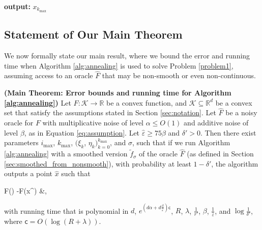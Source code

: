\documentclass[final,12pt]{colt2018} %
\def \be{\begin{equs}}
\def \ee{\end{equs}}
\begin{document}
{\begin{algorithm}[H]
%
%
\textbf{output:} $x_{k_\mathrm{max}}$
\end{algorithm}




\subsection{Statement of Our Main Theorem} \label{sec:theorem}
We now formally state our main result, where we bound the error and running time when Algorithm \ref{alg:annealing} is used to solve Problem \ref{problem1}, assuming access to an oracle $\hat{F}$ that may be non-smooth or even non-continuous.



\begin{theorem} \label{thm:main} \textbf{(Main Theorem: Error bounds and running time for Algorithm \ref{alg:annealing})}
%
Let $F: \mathcal{K} \rightarrow \mathbb{R}$ be a convex function, and $\mathcal{K} \subseteq \mathbb{R}^d$ be a convex set that satisfy the assumptions stated in Section \ref{sec:notation}.
%
  Let $\hat{F}$ be a noisy oracle for $F$ with multiplicative noise of level $\alpha \leq O(1)$ and additive noise of level $\beta$, as in Equation \eqref{eq:assumption}.  
%
Let $\hat{\varepsilon} \geq 75\beta$ and  $\delta' >0$.
%
%
Then there exist parameters  $i_{\textrm{max}}$, $k_{\textrm{max}}$, $(\xi_k$, $\eta_k)_{k=0}^{k_{\mathrm{max}}}$, and $\sigma$, such that if we run Algorithm \ref{alg:annealing} with a smoothed version $\tilde{f}_\sigma$ of the oracle $\hat{F}$  (as defined in Section \ref{sec:smoothed_from_nonsmooth}), with probability at least  $1-\delta'$, the algorithm outputs a point $\hat{x}$ such that
%
\be
F() -F(x^\star) &\leq \hat{\varepsilon},
\ee
%
with running time that is polynomial in $d$, $e^{\left(d\alpha + d\frac{\beta}{\hat{\varepsilon}} \right) \mathsf{c}}$, $R$, ${\lambda}$, $\frac{1}{r'}$, $\beta$, $\frac{1}{\hat{\varepsilon}}$, and $\log \frac{1}{\delta'}$, where $\mathsf{c}=O(\log(R+\lambda))$.
\end{theorem}

}
\end{document}
